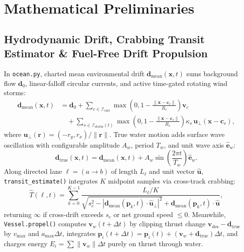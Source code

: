 \documentclass[11pt,a4paper,oneside]{report}
\begin{document}
\section{Mathematical Preliminaries}

\subsection{Hydrodynamic Drift, Crabbing Transit Estimator \& Fuel-Free Drift Propulsion}
In \texttt{ocean.py}, charted mean environmental drift $\mathbf{d}_{\text{mean}}(\mathbf{x}, t)$ sums background flow $\mathbf{d}_0$, linear-falloff circular currents, and active time-gated rotating wind storms:
\begin{equation}
\label{eq:mean-drift}
\begin{aligned}
\mathbf{d}_{\text{mean}}(\mathbf{x}, t) &= \mathbf{d}_0 + \sum_{c \in \mathcal{I}_{\text{curr}}} \max\!\left(0, 1 - \frac{\|\mathbf{x} - \mathbf{c}_c\|}{R_c}\right)\mathbf{v}_c \\
&\quad + \sum_{s \in \mathcal{I}_{\text{storm}}(t)} \max\!\left(0, 1 - \frac{\|\mathbf{x} - \mathbf{c}_s\|}{R_s}\right) \kappa_s \, \mathbf{u}_\perp(\mathbf{x} - \mathbf{c}_s),
\end{aligned}
\end{equation}
where $\mathbf{u}_\perp(\mathbf{r}) = (-r_y, r_x)/\|\mathbf{r}\|$. True water motion adds surface wave oscillation with configurable amplitude $A_w$, period $T_w$, and unit wave axis $\hat{\mathbf{e}}_w$:
\begin{equation}
\label{eq:true-drift}
\mathbf{d}_{\text{true}}(\mathbf{x}, t) = \mathbf{d}_{\text{mean}}(\mathbf{x}, t) + A_w \sin\!\left(\frac{2\pi t}{T_w}\right)\hat{\mathbf{e}}_w.
\end{equation}
Along directed lane $\ell=(a\to b)$ of length $L_\ell$ and unit vector $\hat{\mathbf{u}}$, \texttt{transit\_estimate()} integrates $K$ midpoint samples via cross-track crabbing:
\begin{equation}
\label{eq:transit-est}
\hat{T}(\ell, t) = \sum_{k=0}^{K-1} \frac{L_\ell / K}{\sqrt{s_c^2 - |\mathbf{d}_{\text{mean}}(\mathbf{p}_k, t)\cdot \hat{\mathbf{u}}_\perp|^2} + \mathbf{d}_{\text{mean}}(\mathbf{p}_k, t)\cdot \hat{\mathbf{u}}},
\end{equation}
returning $\infty$ if cross-drift exceeds $s_c$ or net ground speed $\le 0$. Meanwhile, \texttt{Vessel.propel()} computes $\mathbf{v}_w(t+\Delta t)$ by clipping thrust change $\mathbf{v}_{\text{des}} - \mathbf{d}_{\text{true}}$ by $v_{\max}$ and $a_{\max}\Delta t$, integrates $\mathbf{p}_i(t+\Delta t) = \mathbf{p}_i(t) + (\mathbf{v}_w + \mathbf{d}_{\text{true}})\Delta t$, and charges energy $E_i = \sum \|\mathbf{v}_w\|\Delta t$ purely on thrust through water.
\end{document}
